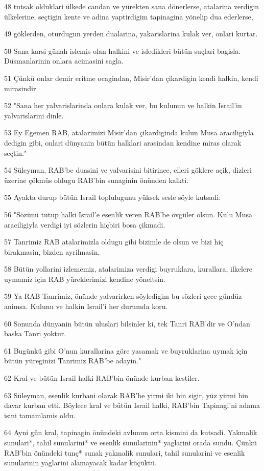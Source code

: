\par 48 tutsak olduklari ülkede candan ve yürekten sana dönerlerse, atalarina verdigin ülkelerine, seçtigin kente ve adina yaptirdigim tapinagina yönelip dua ederlerse,
\par 49 göklerden, oturdugun yerden dualarina, yakarislarina kulak ver, onlari kurtar.
\par 50 Sana karsi günah islemis olan halkini ve isledikleri bütün suçlari bagisla. Düsmanlarinin onlara acimasini sagla.
\par 51 Çünkü onlar demir eritme ocagindan, Misir'dan çikardigin kendi halkin, kendi mirasindir.
\par 52 "Sana her yalvarislarinda onlara kulak ver, bu kulunun ve halkin Israil'in yalvarislarini dinle.
\par 53 Ey Egemen RAB, atalarimizi Misir'dan çikardiginda kulun Musa araciligiyla dedigin gibi, onlari dünyanin bütün halklari arasindan kendine miras olarak seçtin."
\par 54 Süleyman, RAB'be duasini ve yalvarisini bitirince, elleri göklere açik, dizleri üzerine çökmüs oldugu RAB'bin sunaginin önünden kalkti.
\par 55 Ayakta durup bütün Israil toplulugunu yüksek sesle söyle kutsadi:
\par 56 "Sözünü tutup halki Israil'e esenlik veren RAB'be övgüler olsun. Kulu Musa araciligiyla verdigi iyi sözlerin hiçbiri bosa çikmadi.
\par 57 Tanrimiz RAB atalarimizla oldugu gibi bizimle de olsun ve bizi hiç birakmasin, bizden ayrilmasin.
\par 58 Bütün yollarini izlememiz, atalarimiza verdigi buyruklara, kurallara, ilkelere uymamiz için RAB yüreklerimizi kendine yöneltsin.
\par 59 Ya RAB Tanrimiz, önünde yalvarirken söyledigim bu sözleri gece gündüz animsa. Kulunu ve halkin Israil'i her durumda koru.
\par 60 Sonunda dünyanin bütün uluslari bilsinler ki, tek Tanri RAB'dir ve O'ndan baska Tanri yoktur.
\par 61 Bugünkü gibi O'nun kurallarina göre yasamak ve buyruklarina uymak için bütün yüreginizi Tanrimiz RAB'be adayin."
\par 62 Kral ve bütün Israil halki RAB'bin önünde kurban kestiler.
\par 63 Süleyman, esenlik kurbani olarak RAB'be yirmi iki bin sigir, yüz yirmi bin davar kurban etti. Böylece kral ve bütün Israil halki, RAB'bin Tapinagi'ni adama isini tamamlamis oldu.
\par 64 Ayni gün kral, tapinagin önündeki avlunun orta kismini da kutsadi. Yakmalik sunulari*, tahil sunularini* ve esenlik sunularinin* yaglarini orada sundu. Çünkü RAB'bin önündeki tunç* sunak yakmalik sunulari, tahil sunularini ve esenlik sunularinin yaglarini alamayacak kadar küçüktü.
